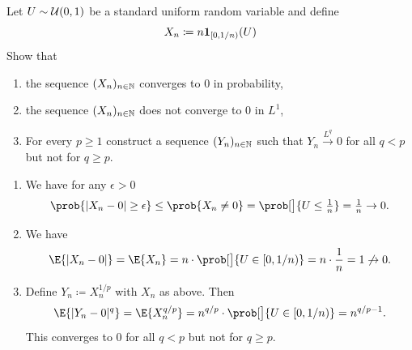
\begin{exercise}[subtitle={Convergence in probability but not \(L^p\) \Coffeecup}]
    \label{ex: convergence in probability but not in Lp}
    Let \(U\sim \mathcal{U}(0,1)\) be a standard uniform random variable and define
    \[
        X_n \coloneq n \ind{[0, 1/n)}(U)
    \]
    Show that
    \begin{enumerate}[label=(\alph*), noitemsep]
        \item\label{it: (conv in prob but not in Lp) in prob}
        the sequence \((X_n)_{n\in \mathbb{N}}\) converges to \(0\) in probability,

        \item\label{it: (conv in prob but not in Lp) not in L1}
        the sequence \((X_n)_{n\in \mathbb{N}}\) does not converge to \(0\) in \(L^1\),

        \item\label{it: (conv in prob but not in Lp) for all q}
        For every \(p \ge 1\) construct a sequence \((Y_n)_{n\in \mathbb{N}}\) such that
        \(Y_n\xrightarrow{L^q} 0\) for all \(q < p\) but not for \(q \ge p\).
    \end{enumerate}
\end{exercise}
\begin{solution}
\begin{enumerate}[wide=0pt]
    \item[\ref{it: (conv in prob but not in Lp) in prob}]
    We have for any \(\epsilon > 0\)
    \[
        \prob{|X_n - 0| \ge \epsilon}
        \le \prob{X_n \neq 0}
        = \prob[\big]{U\le \tfrac1n}
        = \tfrac1n
        \to 0.
    \]

    \item[\ref{it: (conv in prob but not in Lp) not in L1}]
    We have
    \[
        \E{|X_n - 0|}
        = \E{X_n}
        = n \cdot \prob[\big]{U \in [0, 1/n)}
        = n \cdot \frac1n
        = 1 \not\to 0.
    \]            

    \item[\ref{it: (conv in prob but not in Lp) for all q}]
    Define \(Y_n \coloneq X_n^{1/p}\) with \(X_n\) as above. Then
    \[
        \E{|Y_n - 0|^q} = \E{X_n^{q/p}} = n^{q/p} \cdot \prob[\big]{U \in [0, 1/n)} = n^{q/p - 1}.
    \]
    This converges to \(0\) for all \(q < p\) but not for \(q \ge p\).
\end{enumerate}    
\end{solution}

